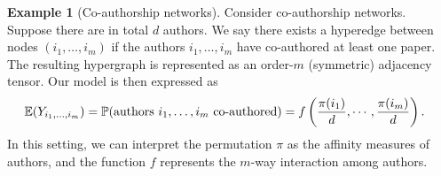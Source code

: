 \documentclass{article}
\theoremstyle{definition}
\newtheorem{example}{Example}
\begin{document}
\begin{example}[Co-authorship networks] Consider co-authorship networks. Suppose there are in total $d$ authors. We say there exists a hyperedge between nodes $(i_1,\ldots,i_m)$ if the authors $i_1,\ldots,i_m$ have co-authored at least one paper. The resulting hypergraph is represented as an order-$m$ (symmetric) adjacency tensor. Our model is then expressed as
\begin{align}
    \mathbb{E}(Y_{i_1,\ldots,i_m})&=\mathbb{P}(\text{authors $i_1,\ldots,i_m$ co-authored})
=f\left({\pi(i_1)\over d},\cdots, {\pi(i_m)\over d}\right).
\end{align}
In this setting, we can interpret the permutation $\pi$ as the affinity measures of authors, and the function $f$ represents the $m$-way interaction among authors.
\end{example}




\end{document}
